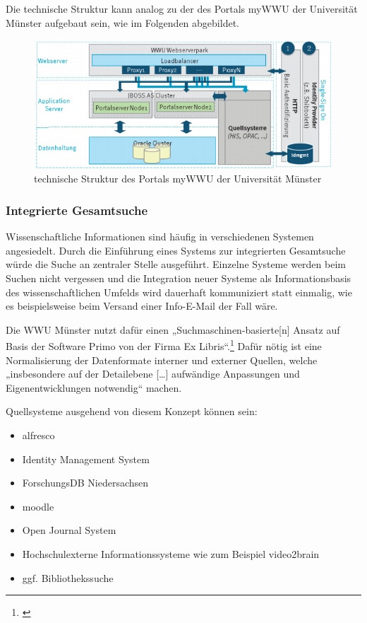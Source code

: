 Die technische Struktur kann analog zu der des Portals myWWU der Universität Münster aufgebaut sein, wie im Folgenden abgebildet.
\begin{figure}[h!]
	\centering
	\includegraphics[width=\textwidth]{kapitel/gruppe3/bilder/struktur_mywwu}
	\caption{technische Struktur des Portals myWWU der Universität Münster}
	\label{fig_struktur_mywwu}
\end{figure}
\newpage

\subsubsection{Integrierte Gesamtsuche}
Wissenschaftliche Informationen sind häufig in verschiedenen Systemen angesiedelt. 
Durch die Einführung eines Systems zur integrierten Gesamtsuche würde die Suche 
an zentraler Stelle ausgeführt. Einzelne Systeme werden beim Suchen nicht vergessen 
und die Integration neuer Systeme als Informationsbasis des wissenschaftlichen 
Umfelds wird dauerhaft kommuniziert statt einmalig, wie es beispielsweise beim 
Versand einer Info-E-Mail der Fall wäre.

Die WWU Münster nutzt dafür einen „Suchmaschinen-basierte[n] Ansatz auf Basis der Software Primo von der Firma Ex Libris“.\footnote{\cite{vogl_fortschritte_2012}} Dafür nötig ist eine Normalisierung der Datenformate interner und externer Quellen, welche „insbesondere auf der Detailebene […] aufwändige Anpassungen und Eigenentwicklungen notwendig“ machen.

Quellsysteme ausgehend von diesem Konzept können sein:
\begin{itemize}
	\item alfresco
	\item Identity Management System
	\item ForschungsDB Niedersachsen
	\item moodle
	\item Open Journal System
	\item Hochschulexterne Informationssysteme wie zum Beispiel video2brain
	\item ggf. Bibliothekssuche
\end{itemize}

